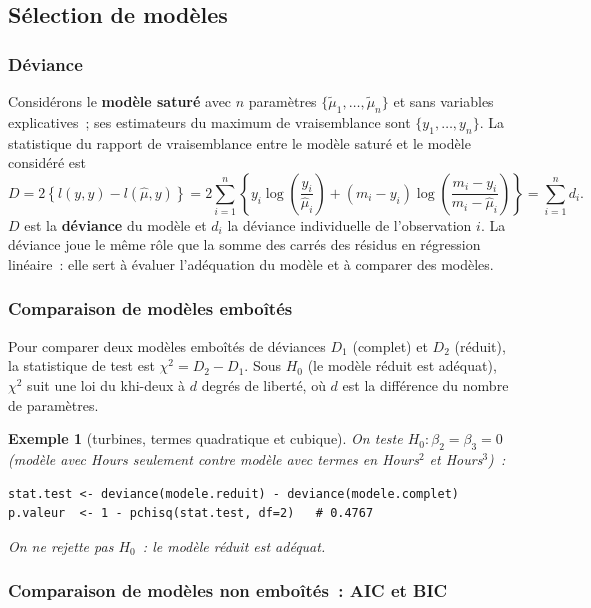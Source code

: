 \documentclass[11pt,letterpaper]{article}
\newtheorem{exemple}{Exemple}[section]
\begin{document}
\subsection{Sélection de modèles}

\subsubsection{Déviance}

Considérons le \textbf{modèle saturé} avec $n$ paramètres $\{\tilde\mu_1,\ldots,\tilde\mu_n\}$ et sans variables explicatives~; ses estimateurs du maximum de vraisemblance sont $\{y_1,\ldots,y_n\}$. La statistique du rapport de vraisemblance entre le modèle saturé et le modèle considéré est
$$D = 2\left\{l(y,y) - l(\hat\mu,y)\right\} = 2\sum_{i=1}^n\left\{y_i\log\!\left(\frac{y_i}{\hat\mu_i}\right) + (m_i - y_i)\log\!\left(\frac{m_i - y_i}{m_i - \hat\mu_i}\right)\right\} = \sum_{i=1}^n d_i.$$
$D$ est la \textbf{déviance} du modèle et $d_i$ la déviance individuelle de l'observation $i$. La déviance joue le même rôle que la somme des carrés des résidus en régression linéaire~: elle sert à évaluer l'adéquation du modèle et à comparer des modèles.

\subsubsection{Comparaison de modèles emboîtés}

Pour comparer deux modèles emboîtés de déviances $D_1$ (complet) et $D_2$ (réduit), la statistique de test est $\chi^2 = D_2 - D_1$. Sous $H_0$ (le modèle réduit est adéquat), $\chi^2$ suit une loi du khi-deux à $d$ degrés de liberté, où $d$ est la différence du nombre de paramètres.

\begin{exemple}[\textsf{turbines}, termes quadratique et cubique]
On teste $H_0: \beta_2 = \beta_3 = 0$ (modèle avec \textsf{Hours} seulement contre modèle avec termes en \textsf{Hours}$^2$ et \textsf{Hours}$^3$)~:
\begin{verbatim}
stat.test <- deviance(modele.reduit) - deviance(modele.complet)
p.valeur  <- 1 - pchisq(stat.test, df=2)   # 0.4767
\end{verbatim}
On ne rejette pas $H_0$~: le modèle réduit est adéquat.
\end{exemple}

\subsubsection{Comparaison de modèles non emboîtés~: AIC et BIC}
\end{document}
